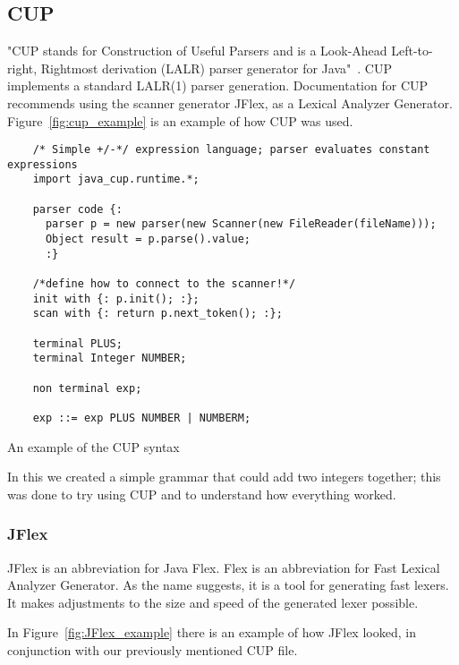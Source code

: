 \subsection{CUP}
"CUP stands for Construction of Useful Parsers and is a Look-Ahead Left-to-right, Rightmost derivation (LALR) parser generator for Java"~\cite{cupParserGenerator}. CUP implements a standard LALR(1) parser generation. Documentation for CUP recommends using the scanner generator JFlex, as a Lexical Analyzer Generator. Figure~\ref{fig:cup_example} is an example of how CUP was used.


\begin{listing}[htb!]
  \centering
  \begin{verbatim}
    /* Simple +/-*/ expression language; parser evaluates constant expressions
    import java_cup.runtime.*;

    parser code {:
      parser p = new parser(new Scanner(new FileReader(fileName)));
      Object result = p.parse().value;  
      :}

    /*define how to connect to the scanner!*/
    init with {: p.init(); :};
    scan with {: return p.next_token(); :};

    terminal PLUS;
    terminal Integer NUMBER;

    non terminal exp;

    exp ::= exp PLUS NUMBER | NUMBERM;

  \end{verbatim}
  \caption{An example of the CUP syntax}
  \label{List:cup}
\end{listing}

In this we created a simple grammar that could add two integers together; this was done to try using CUP and to understand how everything worked.


\subsubsection{JFlex}
JFlex is an abbreviation for Java Flex. Flex is an abbreviation for Fast Lexical Analyzer Generator. As the name suggests, it is a tool for generating fast lexers. It makes adjustments to the size and speed of the generated lexer possible.

In Figure~\ref{fig:JFlex_example} there is an example of how JFlex looked, in conjunction with our previously mentioned CUP file.


